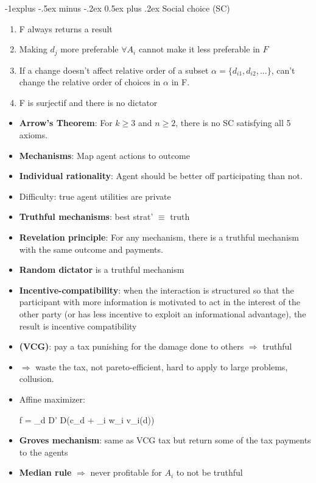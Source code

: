 \documentclass[10pt,a4paper,landscape]{article}
\makeatletter
\renewcommand{\subsection}{\@startsection{subsection}{2}{0mm}%
                                {-1explus -.5ex minus -.2ex}%
                                {0.5ex plus .2ex}%
                                {\normalfont\tiny\bfseries}}
\DeclareMathOperator*{\argmax}{argmax}
\newenvironment{myalign*}{%
  \setlength{\abovedisplayskip}{2pt}%
  \setlength{\belowdisplayskip}{2pt}%
  \start@align\@ne\st@rredtrue\m@ne
}%
{\endalign}
\makeatother
\begin{document}
\begin{multicols*}{5}
\subsection{Social choice (SC)}
\begin{enumerate}
		\item F always returns a result
		\item Making $d_j$ more preferable $\forall A_i$ cannot make it less preferable in $F$
		\item If a change doesn't affect relative order of a subset $\alpha = \{d_{i1}, d_{i2},... \}$, can't change the relative order of choices in $\alpha$ in F.
		\item F is surjectif and there is no dictator 
	\end{enumerate}
\begin{itemize}
	\item \textbf{Arrow's Theorem}: For $k \geq 3$ and $n \geq 2$, there is no SC satisfying all 5 axioms.
	\item \textbf{Mechanisms}: Map agent actions to outcome
	\item \textbf{Individual rationality}: Agent should be better off participating than not.
	\item Difficulty: true agent utilities are private
	\item \textbf{Truthful mechanisms}: best strat' $\equiv$ truth
	\item \textbf{Revelation principle}: For any mechanism, there is a truthful mechanism with the same outcome and payments.
	\item \textbf{Random dictator} is a truthful mechanism
	\item \textbf{Incentive-compatibility}: when the interaction is structured so that the participant with more information is motivated to act in the interest of the other party (or has less incentive to exploit an informational advantage), the result is incentive compatibility
	\item \textbf{(VCG)}: pay a tax punishing for the damage done to others $\Rightarrow$ truthful
	\begin{comment}
		\begin{align*}
		    tax(A_i) = \sum_{A_j \in A, i \neq j} (v_j (d - i) - v_j () )
		\end{align*}
	\end{comment}
	
	\item $\Rightarrow$ waste the tax, not pareto-efficient, hard to apply to large problems, collusion.
	\item Affine maximizer:
	\begin{myalign*}
	    f = \argmax_{d \in D' \subset D}(c_d + \sum_i w_i v_i(d))
	\end{myalign*}
	\item \textbf{Groves mechanism}: same as VCG tax but return some of the tax payments to the agents
	\item \textbf{Median rule} $\Rightarrow$ never profitable for $A_i$ to not be truthful
\end{itemize}


\end{multicols*}
\end{document}
